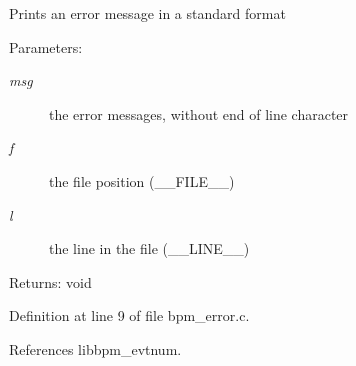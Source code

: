 Prints an error message in a standard format

\begin{Desc}
\item[Parameters:]
\begin{description}
\item[{\em msg}]the error messages, without end of line character \item[{\em f}]the file position (\_\-\_\-FILE\_\-\_\-) \item[{\em l}]the line in the file (\_\-\_\-LINE\_\-\_\-)\end{description}
\end{Desc}
\begin{Desc}
\item[Returns:]void \end{Desc}


Definition at line 9 of file bpm\_\-error.c.

References libbpm\_\-evtnum.

